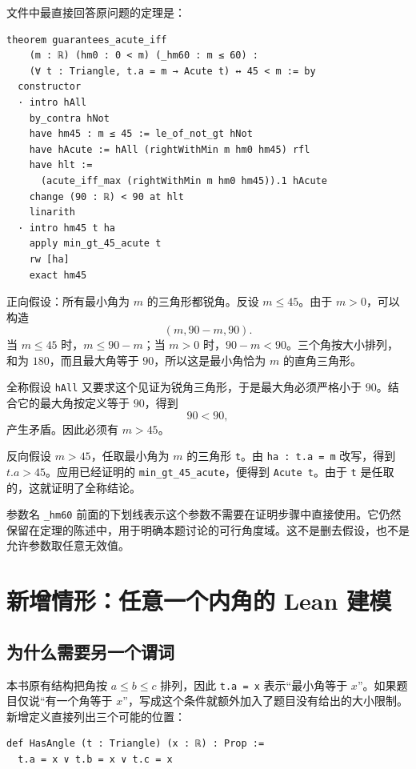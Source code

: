 \documentclass[UTF8,a4paper,zihao=-4,oneside,openany,fontset=fandol]{ctexbook}
\theoremstyle{definition}
\theoremstyle{remark}
\begin{document}
文件中最直接回答原问题的定理是：
\begin{Verbatim}[fontsize=\small,breaklines=true]
theorem guarantees_acute_iff
    (m : ℝ) (hm0 : 0 < m) (_hm60 : m ≤ 60) :
    (∀ t : Triangle, t.a = m → Acute t) ↔ 45 < m := by
  constructor
  · intro hAll
    by_contra hNot
    have hm45 : m ≤ 45 := le_of_not_gt hNot
    have hAcute := hAll (rightWithMin m hm0 hm45) rfl
    have hlt :=
      (acute_iff_max (rightWithMin m hm0 hm45)).1 hAcute
    change (90 : ℝ) < 90 at hlt
    linarith
  · intro hm45 t ha
    apply min_gt_45_acute t
    rw [ha]
    exact hm45
\end{Verbatim}

正向假设：所有最小角为 $m$ 的三角形都锐角。反设 $m\le45$。由于 $m>0$，可以构造
\[
(m,90-m,90).
\]
当 $m\le45$ 时，$m\le90-m$；当 $m>0$ 时，$90-m<90$。三个角按大小排列，和为 $180$，而且最大角等于 $90$，所以这是最小角恰为 $m$ 的直角三角形。

全称假设 \texttt{hAll} 又要求这个见证为锐角三角形，于是最大角必须严格小于 $90$。结合它的最大角按定义等于 $90$，得到
\[
90<90,
\]
产生矛盾。因此必须有 $m>45$。

反向假设 $m>45$，任取最小角为 $m$ 的三角形 \texttt{t}。由 \texttt{ha : t.a = m} 改写，得到 $t.a>45$。应用已经证明的 \texttt{min\_gt\_45\_acute}，便得到 \texttt{Acute t}。由于 \texttt{t} 是任取的，这就证明了全称结论。

参数名 \texttt{\_hm60} 前面的下划线表示这个参数不需要在证明步骤中直接使用。它仍然保留在定理的陈述中，用于明确本题讨论的可行角度域。这不是删去假设，也不是允许参数取任意无效值。

\section{新增情形：任意一个内角的 Lean 建模}
\label{sec:lean-any-angle}

\subsection{为什么需要另一个谓词}

本书原有结构把角按 $a\le b\le c$ 排列，因此 \texttt{t.a = x} 表示“最小角等于 $x$”。如果题目仅说“有一个角等于 $x$”，写成这个条件就额外加入了题目没有给出的大小限制。新增定义直接列出三个可能的位置：

\begin{Verbatim}
def HasAngle (t : Triangle) (x : ℝ) : Prop :=
  t.a = x ∨ t.b = x ∨ t.c = x
\end{Verbatim}
\end{document}

